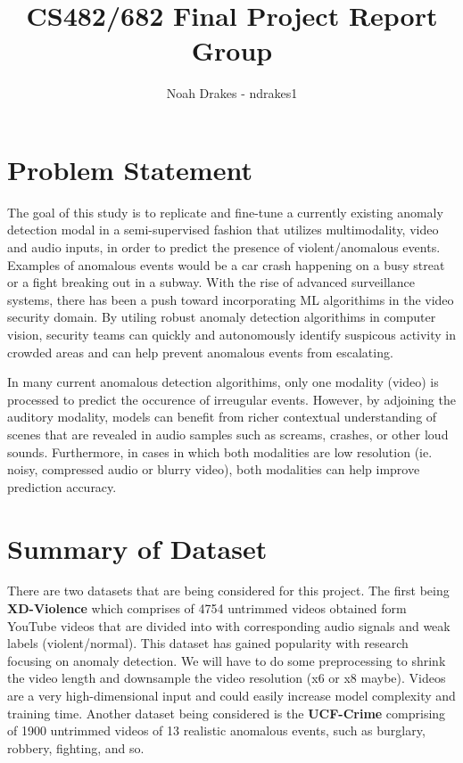 \documentclass[twocolumn]{article}
\title{CS482/682 Final Project Report Group \todo{XX}\\
	\large \todo{your project title here}}
\author{Noah Drakes - ndrakes1}
\date{}
\newcommand{\todo}[1]{\textcolor{red}{#1}}
\begin{document}
	
	\maketitle
	
	\section{Problem Statement}
	
	The goal of this study is to replicate and fine-tune a currently existing anomaly detection modal in a semi-supervised fashion that utilizes multimodality, 
	video and audio inputs, in order to predict the presence of violent/anomalous events. Examples of anomalous 
	events would be a car crash happening on a busy streat or a fight breaking out in a subway. With the rise of advanced
	surveillance systems, there has been a push toward incorporating ML algorithims in the video security domain. 
	By utiling robust anomaly detection algorithims in computer vision, security teams can quickly and autonomously identify 
	suspicous activity in crowded areas and can help prevent anomalous events from escalating.

	In many current anomalous detection algorithims, only one modality (video) is processed to predict the occurence of irreugular events. 
	However, by adjoining the auditory modality, models can benefit from richer contextual understanding of scenes that are revealed 
	in audio samples such as screams, crashes, or other loud sounds. Furthermore, in cases in which both modalities 
	are low resolution (ie. noisy, compressed audio or blurry video), both modalities can help improve prediction accuracy.


	
	\section{Summary of Dataset}
	There are two datasets that are being considered for this project. The first being \textbf{XD-Violence} which
	comprises of 4754 untrimmed videos obtained form YouTube videos that are divided into with corresponding audio signals and weak labels (violent/normal).
	This dataset has gained popularity with research focusing on anomaly detection. We will have to do some preprocessing
	to shrink the video length and downsample the video resolution (x6 or x8 maybe). Videos are a very high-dimensional input and could 
	easily increase model complexity and training time. Another dataset being considered is the \textbf{UCF-Crime} comprising of 1900
	untrimmed videos of 13 realistic anomalous events, such as burglary, robbery, fighting, and so. 
\end{document}
